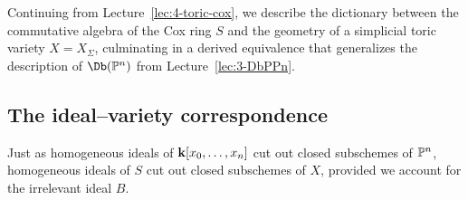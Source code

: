 \documentclass{amsart}
\begin{document}



Continuing from Lecture~\ref{lec:4-toric-cox}, we describe the dictionary between the commutative algebra of the Cox ring $S$ and the geometry of a simplicial toric variety $X = X_\Sigma$, culminating in a derived equivalence that generalizes the description of $\Db(\PP^n)$ from Lecture~\ref{lec:3-DbPPn}.

\subsection{The ideal--variety correspondence}

Just as homogeneous ideals of ${\bf k}[x_0,\dots,x_n]$ cut out closed subschemes of $\mathbb P^n$, homogeneous ideals of $S$ cut out closed subschemes of $X$, provided we account for the irrelevant ideal $B$.

\end{document}
